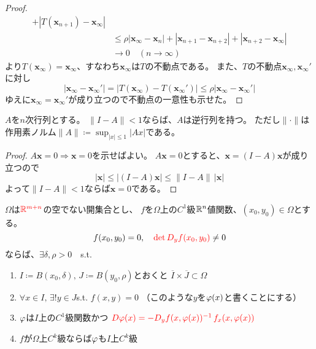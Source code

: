 \documentclass[report]{jlreq}
\begin{document}
\begin{proof}
\begin{equation}
\begin{split}
                    + |T(\bm{x}_{n+1}) - \bm{x}_\infty| \\
                &\le \rho |\bm{x}_\infty - \bm{x}_n|
                    + |\bm{x}_{n+1} - \bm{x}_{n+2}|
                    + |\bm{x}_{n+2} - \bm{x}_\infty| \\
                &\to 0 \quad (n \to \infty)
        \end{split}
    \end{equation}
    より$T(\bm{x}_\infty) = \bm{x}_\infty$、すなわち$\bm{x}_\infty$は$T$の不動点である。
    また、$T$の不動点$\bm{x}_\infty, \bm{x}_\infty'$に対し
    \begin{equation}
        |\bm{x}_\infty - \bm{x}_\infty'| = |T(\bm{x}_\infty) - T(\bm{x}_\infty')|
            \le \rho |\bm{x}_\infty - \bm{x}_\infty'|
    \end{equation}
    ゆえに$\bm{x}_\infty = \bm{x}_\infty'$が成り立つので不動点の一意性も示せた。
\end{proof}


\begin{lemma}
    $A$を$n$次行列とする。
    $\| I - A \| < 1$ならば、$A$は逆行列を持つ。
    ただし$\| \cdot \|$は作用素ノルム$\| A \| \coloneqq \sup_{|x| \le 1} |Ax|$である。
    \label{6:lem:1}
\end{lemma}

\begin{proof}
    $A\bm{x} = 0 \Rightarrow \bm{x} = 0$を示せばよい。
    $A\bm{x} = 0$とすると、$\bm{x} = (I - A)\bm{x}$が成り立つので
    \begin{equation}
        |\bm{x}| \le |(I - A) \bm{x}| \le \| I - A \|\, |\bm{x}|
    \end{equation}
    よって$\| I - A \| < 1$ならば$\bm{x} = 0$である。
\end{proof}


\begin{theorem}[一般次元での陰関数定理]
    $\Omega$は$\textcolor{red}{\mathbb{R}^{m+n}}$の空でない開集合とし、
    $f$を$\Omega$上の$C^1$級$\mathbb{R}^n$値関数、$(x_0, y_0) \in \Omega$とする。
    \begin{equation}
        f(x_0, y_0) = 0,\quad \textcolor{red}{\det D_y f(x_0, y_0)} \neq 0
    \end{equation}
    ならば、$\exists \delta, \rho > 0\quad$s.t.
    \begin{enumerate}
        \item $I \coloneqq B(x_0, \delta),\,
            J \coloneqq B(y_0, \rho)$とおくと
            $\overline{I} \times \overline{J} \subset \Omega$
        \item $\forall x \in I,\, \exists! y \in J$\quad s.t. \quad
            $f(x, y) = 0$
            \quad（このような$y$を$\varphi(x)$と書くことにする）
        \item $\varphi$は$I$上の$C^1$級関数かつ
            $\textcolor{red}{D \varphi(x) = - D_y f(x, \varphi(x))^{-1}\, f_x(x, \varphi(x))}$
        \item $f$が$\Omega$上$C^k$級ならば$\varphi$も$I$上$C^k$級
    \end{enumerate}
    \label{6:thm:3}
\end{theorem}
\end{document}
